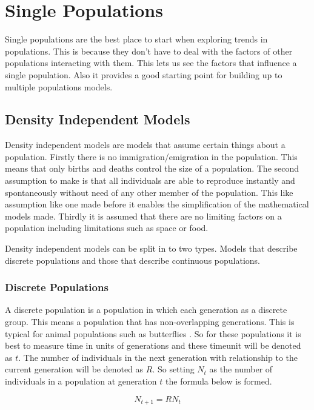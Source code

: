 \documentclass[final]{cmpreport}
\begin{document}
	
\section{Single Populations}
	
	Single populations are the best place to start when exploring trends in populations. This is because they don't have to deal with the factors of other populations interacting with them. This lets us see the factors that influence a single population. Also it provides a good starting point for building up to multiple populations models.
	
	\subsection{Density Independent Models}
	
	Density independent models are models that assume certain things about a population. Firstly there is no immigration/emigration in the population. This means that only births and deaths control the size of a population. The second assumption to make is that all individuals are able to reproduce instantly and spontaneously without need of any other member of the population. This like assumption like one made before it enables the simplification of the mathematical models made. Thirdly it is assumed that there are no limiting factors on a population including limitations such as space or food.
	
	Density independent models can be split in to two types. Models that describe discrete populations and those that describe continuous populations.
	
	\subsubsection{Discrete Populations}
	
	A discrete population is a population in which each generation as a discrete group. This means a population that has non-overlapping generations. This is typical for animal populations such as butterflies . So for these populations it is best to measure time in units of generations and these timeunit will be denoted as $t$. The number of individuals in the next generation with relationship to the current generation will be denoted as $R$. So setting $N_t$ as the number of individuals in a population at generation $t$ the formula below is formed.

	\begin{equation}
		N_{t+1}=RN_t
	\end{equation}
	
\end{document}
